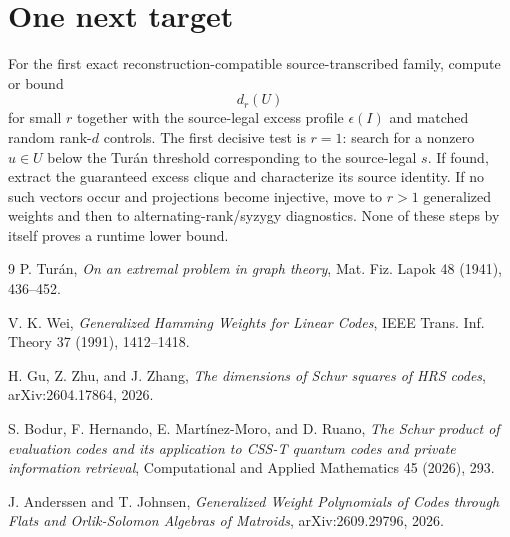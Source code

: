 \documentclass[11pt]{article}
\begin{document}
\section*{One next target}
For the first exact reconstruction-compatible source-transcribed family, compute or bound
\[
d_r(U)
\]
for small $r$ together with the source-legal excess profile $\epsilon(I)$ and matched random rank-$d$ controls. The first decisive test is $r=1$: search for a nonzero $u\in U$ below the Tur\'an threshold corresponding to the source-legal $s$. If found, extract the guaranteed excess clique and characterize its source identity. If no such vectors occur and projections become injective, move to $r>1$ generalized weights and then to alternating-rank/syzygy diagnostics. None of these steps by itself proves a runtime lower bound.

\begin{thebibliography}{9}
P. Tur\'an, \emph{On an extremal problem in graph theory}, Mat. Fiz. Lapok 48 (1941), 436--452.

V. K. Wei, \emph{Generalized Hamming Weights for Linear Codes}, IEEE Trans. Inf. Theory 37 (1991), 1412--1418.

H. Gu, Z. Zhu, and J. Zhang, \emph{The dimensions of Schur squares of HRS codes}, arXiv:2604.17864, 2026.

S. Bodur, F. Hernando, E. Mart\'inez-Moro, and D. Ruano, \emph{The Schur product of evaluation codes and its application to CSS-T quantum codes and private information retrieval}, Computational and Applied Mathematics 45 (2026), 293.

J. Anderssen and T. Johnsen, \emph{Generalized Weight Polynomials of Codes through Flats and Orlik-Solomon Algebras of Matroids}, arXiv:2609.29796, 2026.
\end{thebibliography}
\end{document}
